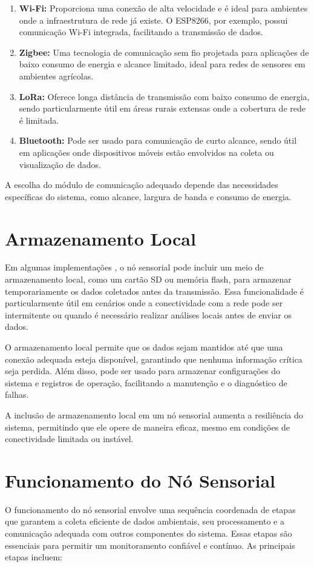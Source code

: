 \begin{enumerate} 
    \item \textbf{Wi-Fi:} Proporciona uma conexão de alta velocidade e é ideal para ambientes onde a infraestrutura de rede já existe. O ESP8266, por exemplo, possui comunicação Wi-Fi integrada, facilitando a transmissão de dados. 
    \item \textbf{Zigbee:} Uma tecnologia de comunicação sem fio projetada para aplicações de baixo consumo de energia e alcance limitado, ideal para redes de sensores em ambientes agrícolas. 
    \item \textbf{LoRa:} Oferece longa distância de transmissão com baixo consumo de energia, sendo particularmente útil em áreas rurais extensas onde a cobertura de rede é limitada. 
    \item \textbf{Bluetooth:} Pode ser usado para comunicação de curto alcance, sendo útil em aplicações onde dispositivos móveis estão envolvidos na coleta ou visualização de dados. 
\end{enumerate}

A escolha do módulo de comunicação adequado depende das necessidades específicas do sistema, como alcance, largura de banda e consumo de energia.


\section{Armazenamento Local}

Em algumas implementações \cite{vidadesilicio_nodemcu_sd_module}, o nó sensorial pode incluir um meio de armazenamento local, como um cartão SD ou memória flash, para armazenar temporariamente os dados coletados antes da transmissão. Essa funcionalidade é particularmente útil em cenários onde a conectividade com a rede pode ser intermitente ou quando é necessário realizar análises locais antes de enviar os dados.

O armazenamento local permite que os dados sejam mantidos até que uma conexão adequada esteja disponível, garantindo que nenhuma informação crítica seja perdida. Além disso, pode ser usado para armazenar configurações do sistema e registros de operação, facilitando a manutenção e o diagnóstico de falhas.

A inclusão de armazenamento local em um nó sensorial aumenta a resiliência do sistema, permitindo que ele opere de maneira eficaz, mesmo em condições de conectividade limitada ou instável.

\section{Funcionamento do Nó Sensorial}
O funcionamento do nó sensorial envolve uma sequência coordenada de etapas que garantem a coleta eficiente de dados ambientais, seu processamento e a comunicação adequada com outros componentes do sistema. Essas etapas são essenciais para permitir um monitoramento confiável e contínuo. As principais etapas incluem:

